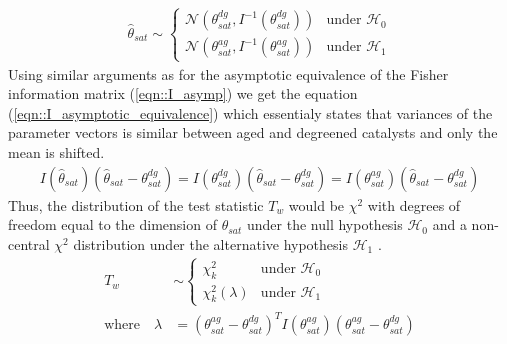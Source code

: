 \begin{align}
        \hat \theta_{sat} \sim
        \begin{cases}
        \mathcal{N}(\theta^{dg}_{sat}, I^{-1}(\theta^{dg}_{sat})) & \text{under } \mathcal{H}_0 \\
        \mathcal{N}(\theta^{ag}_{sat}, I^{-1}(\theta^{ag}_{sat})) & \text{under } \mathcal{H}_1
        \end{cases}
\end{align}
Using similar arguments as for the asymptotic equivalence of the Fisher
information matrix (\ref{eqn::I_asymp}) we get the equation
(\ref{eqn::I_asymptotic_equivalence}) which essentialy states that variances of
the parameter vectors is similar between aged and degreened catalysts and only
the mean is shifted.
\begin{align}
        I(\hat \theta_{sat}) (\hat \theta_{sat} - \theta^{dg}_{sat}) =
        I(\theta^{dg}_{sat}) (\hat \theta_{sat} - \theta^{dg}_{sat}) =
        I(\theta^{ag}_{sat}) (\hat \theta_{sat} - \theta^{dg}_{sat})
        \label{eqn::I_asymptotic_equivalence}
\end{align}
Thus, the distribution of the test statistic $T_w$ would be $\chi^2$ with degrees of freedom equal to the dimension of $\theta_{sat}$ under the null hypothesis $\mathcal{H}_0$ and a non-central $\chi^2$ distribution under the alternative hypothesis $\mathcal{H}_1$ \cite{kay1998detection}.
\begin{align}
        T_w &\sim
        \begin{cases}
        \chi^2_k & \text{under } \mathcal{H}_0 \\
        \chi^2_k (\lambda) & \text{under } \mathcal{H}_1
        \end{cases} \\
        \text{where} \quad \lambda &= (\theta^{ag}_{sat} - \theta^{dg}_{sat})^T I(\theta^{ag}_{sat}) (\theta^{ag}_{sat} - \theta^{dg}_{sat})
\end{align}

